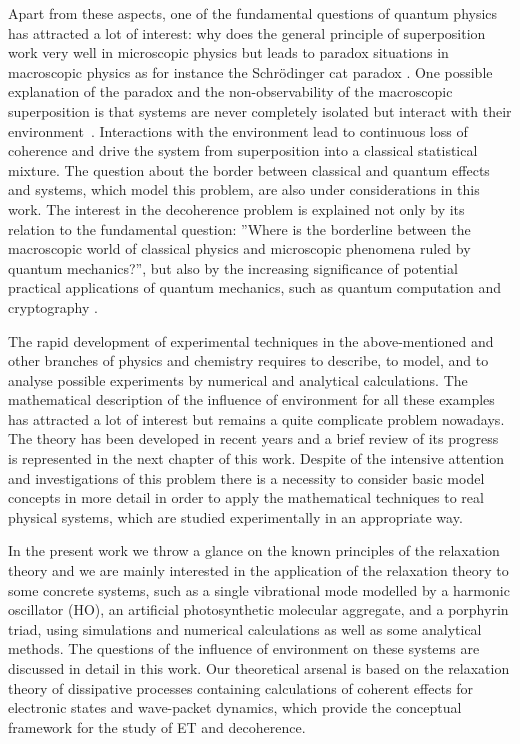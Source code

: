 \documentclass[12pt,twoside,a4paper]{report}
\begin{document}
Apart from these aspects, one of the fundamental questions of quantum 
physics  has attracted a lot of 
interest: why does the general principle of superposition work
very well in  microscopic physics but 
leads to paradox situations in macroscopic physics 
as 
for instance 
the Schr\"{o}dinger cat paradox \cite{1}. 
One possible explanation of the paradox and 
the non-observability of the  
macroscopic superposition is that 
systems are never completely 
isolated but interact with their environment~\cite{2}. 
Interactions with the environment 
lead to continuous loss of coherence and drive the system from 
superposition into  
a classical statistical mixture. 
The question about the 
border between classical and quantum effects and systems, which model this 
problem, are also under considerations in this work. The interest in the 
decoherence problem is explained not only by its relation to the fundamental 
question: ''Where is the borderline between the macroscopic world of 
classical physics and microscopic phenomena ruled by quantum mechanics?'', 
but also by the increasing significance of potential practical applications 
of quantum mechanics, such as quantum computation and cryptography \cite{3,4}. 
 
The rapid development of experimental techniques in the above-mentioned and 
other branches of physics and chemistry requires to describe, to model, and 
to analyse possible experiments by numerical and analytical calculations. 
The mathematical description of the  influence of environment for all these 
examples has attracted a lot of interest but remains a quite complicate
problem nowadays. The theory has been developed in recent years and a brief 
review of its progress is represented in the next chapter of this work. 
Despite of the intensive attention and investigations of this problem there 
is a necessity to consider basic model concepts in more detail in order to 
apply the mathematical techniques to real physical systems, which are 
studied experimentally in an appropriate way.  
 
In the present work 
we throw a glance on the known principles of the
relaxation theory
and we are mainly interested in 
the application of the relaxation theory to 
some concrete systems, such as a  single 
vibrational mode modelled by 
a  harmonic oscillator (HO), 
an artificial  photosynthetic molecular aggregate, and 
a  porphyrin triad, 
using simulations 
and numerical calculations as well as some analytical methods. The questions 
of the influence  of environment on these systems are discussed in detail in 
this work. 
Our theoretical arsenal 
is based on
the relaxation theory of 
dissipative processes containing calculations of coherent effects for 
electronic states and wave-packet dynamics, which provide the conceptual 
framework for the study of ET and decoherence. 
 
\end{document}
